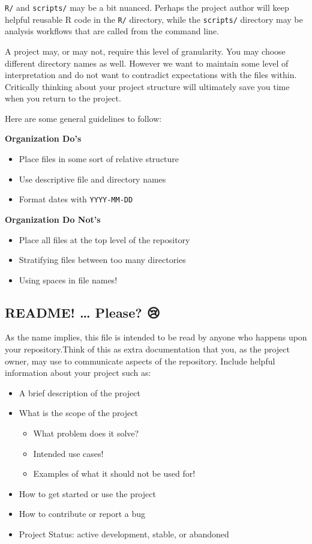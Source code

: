 \documentclass[
  letterpaper,
  DIV=11,
  numbers=noendperiod]{scrreprt}
\providecommand{\tightlist}{%
  \setlength{\itemsep}{0pt}\setlength{\parskip}{0pt}}\usepackage{longtable,booktabs,array}
\begin{document}
\texttt{R/} and \texttt{scripts/} may be a bit nuanced. Perhaps the
project author will keep helpful reusable R code in the \texttt{R/}
directory, while the \texttt{scripts/} directory may be analysis
workflows that are called from the command line.

A project may, or may not, require this level of granularity. You may
choose different directory names as well. However we want to maintain
some level of interpretation and do not want to contradict expectations
with the files within. Critically thinking about your project structure
will ultimately save you time when you return to the project.

Here are some general guidelines to follow:

\textbf{Organization Do's}

\begin{itemize}
\tightlist
\item
  Place files in some sort of relative structure
\item
  Use descriptive file and directory names
\item
  Format dates with \texttt{YYYY-MM-DD}
\end{itemize}

\textbf{Organization Do Not's}

\begin{itemize}
\tightlist
\item
  Place all files at the top level of the repository
\item
  Stratifying files between too many directories
\item
  Using spaces in file names!
\end{itemize}

\hypertarget{readme-please}{%
\subsection{README! \ldots{} Please? 😢}\label{readme-please}}

As the name implies, this file is intended to be read by anyone who
happens upon your repository.Think of this as extra documentation that
you, as the project owner, may use to communicate aspects of the
repository. Include helpful information about your project such as:

\begin{itemize}
\tightlist
\item
  A brief description of the project
\item
  What is the scope of the project

  \begin{itemize}
  \tightlist
  \item
    What problem does it solve?
  \item
    Intended use cases!
  \item
    Examples of what it should not be used for!
  \end{itemize}
\item
  How to get started or use the project
\item
  How to contribute or report a bug
\item
  Project Status: active development, stable, or abandoned
\end{itemize}
\end{document}
